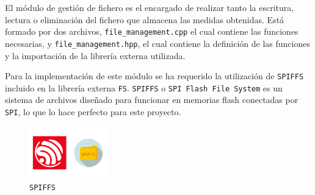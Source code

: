 El módulo de gestión de fichero es el encargado de realizar tanto la escritura, lectura o eliminación del fichero que almacena las medidas obtenidas. Está formado por dos archivos, \texttt{file\_management.cpp} el cual contiene las funciones necesarias, y \texttt{file\_management.hpp}, el cual contiene la definición de las funciones y la importación de la librería externa utilizada.


Para la implementación de este módulo se ha requerido la utilización de \texttt{SPIFFS} incluido en la librería externa \texttt{FS}. \texttt{SPIFFS} o \texttt{SPI Flash File System} es un sistema de archivos diseñado para funcionar en memorias flash conectadas por \texttt{SPI}, lo que lo hace perfecto para este proyecto.

\begin{figure}[H]
    \centering
    \includegraphics[width=0.3\textwidth]{images/3-software/3-2-1-filemng/esp8266-spiffs.png}
    \caption{\texttt{SPIFFS}}
    \label{fig:3-2-1-1-SPIFFS}
\end{figure}


